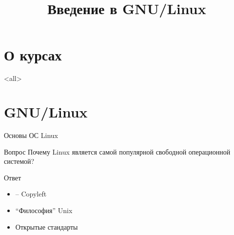 

\title{Введение в GNU/Linux}








\begin{frame}
	\frametitle{}
	\titlepage
	\vspace{-0.5cm}
	\begin{center}
	\end{center}
\end{frame}


\begin{frame}
	\tableofcontents
	[hideallsubsections]
\end{frame}

\section{О курсах}

\mode<all>{}

\section*{GNU/Linux}

\begin{frame}{Основы ОС Linux}

	\begin{block}{Вопрос}
	Почему Linux является самой популярной
	свободной операционной системой?
	\end{block}

	\pause

	\begin{block}{Ответ}
	\begin{itemize}
		\item \textcopyleft -- Copyleft
		\item ``Философия'' Unix
		\item Открытые стандарты
	\end{itemize}
	\end{block}

\end{frame}



